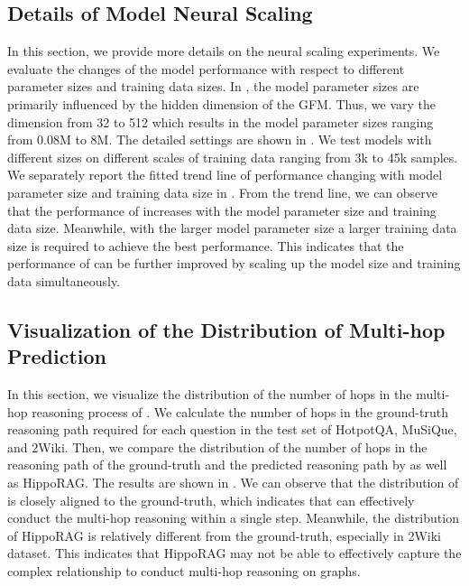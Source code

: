 

\subsection{Details of Model Neural Scaling}\label{app:scaling}
In this section, we provide more details on the neural scaling experiments. We evaluate the changes of the model performance with respect to different parameter sizes and training data sizes. In \ourmethod, the model parameter sizes are primarily influenced by the hidden dimension of the GFM. Thus, we vary the dimension from 32 to 512 which results in the model parameter sizes ranging from 0.08M to 8M. The detailed settings are shown in . We test models with different sizes on different scales of training data ranging from 3k to 45k samples. We separately report the fitted trend line of performance changing with model parameter size and training data size in . From the trend line, we can observe that the performance of \ourmethod increases with the model parameter size and training data size. Meanwhile, with the larger model parameter size a larger training data size is required to achieve the best performance. This indicates that the performance of \ourmethod can be further improved by scaling up the model size and training data simultaneously.


\subsection{Visualization of the Distribution of Multi-hop Prediction}\label{app:multi_hop}
In this section, we visualize the distribution of the number of hops in the multi-hop reasoning process of \ourmethod. We calculate the number of hops in the ground-truth reasoning path required for each question in the test set of HotpotQA, MuSiQue, and 2Wiki. Then, we compare the distribution of the number of hops in the reasoning path of the ground-truth and the predicted reasoning path by \ourmethod as well as HippoRAG.
%
The results are shown in . We can observe that the distribution of \ourmethod is closely aligned to the ground-truth, which indicates that \ourmethod can effectively conduct the multi-hop reasoning within a single step. Meanwhile, the distribution of HippoRAG is relatively different from the ground-truth, especially in 2Wiki dataset. This indicates that HippoRAG may not be able to effectively capture the complex relationship to conduct multi-hop reasoning on graphs.